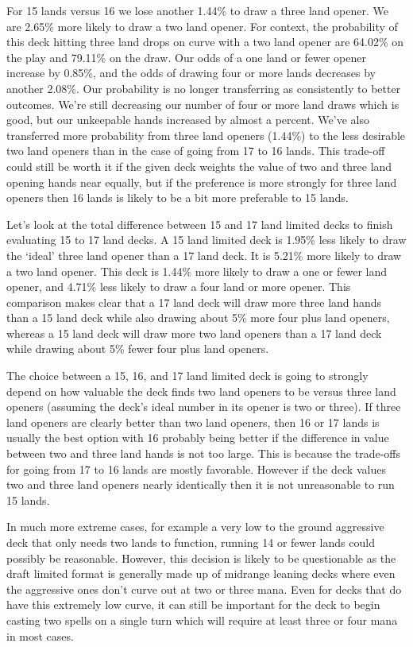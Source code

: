\documentclass[oneside]{book}   %
\begin{document}
For 15 lands versus 16 we lose another 1.44\% to draw a three land opener. We are 2.65\% more likely to draw a two land opener. For context, the probability of this deck hitting three land drops on curve with a two land opener are 64.02\% on the play and 79.11\% on the draw. Our odds of a one land or fewer opener increase by 0.85\%, and the odds of drawing four or more lands decreases by another 2.08\%. Our probability is no longer transferring as consistently to better outcomes. We're still decreasing our number of four or more land draws which is good, but our unkeepable hands increased by almost a percent. We've also transferred more probability from three land openers (1.44\%) to the less desirable two land openers than in the case of going from 17 to 16 lands. This trade-off could still be worth it if the given deck weights the value of two and three land opening hands near equally, but if the preference is more strongly for three land openers then 16 lands is likely to be a bit more preferable to 15 lands.

Let's look at the total difference between 15 and 17 land limited decks to finish evaluating 15 to 17 land decks. A 15 land limited deck is 1.95\% less likely to draw the `ideal' three land opener than a 17 land deck. It is 5.21\% more likely to draw a two land opener. This deck is 1.44\% more likely to draw a one or fewer land opener, and 4.71\% less likely to draw a four land or more opener. This comparison makes clear that a 17 land deck will draw more three land hands than a 15 land deck while also drawing about 5\% more four plus land openers, whereas a 15 land deck will draw more two land openers than a 17 land deck while drawing about 5\% fewer four plus land openers. 

The choice between a 15, 16, and 17 land limited deck is going to strongly depend on how valuable the deck finds two land openers to be versus three land openers (assuming the deck's ideal number in its opener is two or three). If three land openers are clearly better than two land openers, then 16 or 17 lands is usually the best option with 16 probably being better if the difference in value between two and three land hands is not too large. This is because the trade-offs for going from 17 to 16 lands are mostly favorable. However if the deck values two and three land openers nearly identically then it is not unreasonable to run 15 lands. 

In much more extreme cases, for example a very low to the ground aggressive deck that only needs two lands to function, running 14 or fewer lands could possibly be reasonable. However, this decision is likely to be questionable as the draft limited format is generally made up of midrange leaning decks where even the aggressive ones don't curve out at two or three mana. Even for decks that do have this extremely low curve, it can still be important for the deck to begin casting two spells on a single turn which will require at least three or four mana in most cases.
\end{document}

